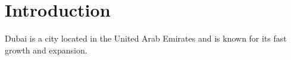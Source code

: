 \section{Introduction}
Dubai is a city located in the United Arab Emirates and is known for its fast growth and expansion.
